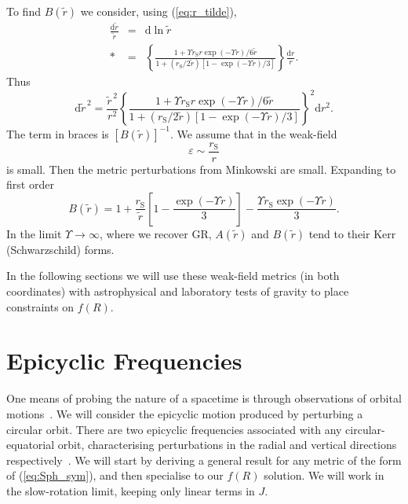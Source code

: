 \documentclass[aps,prd,amsfonts,amssymb,amsmath,nofootinbib,reprint,showpacs]{revtex4-1}
\newcommand{\eqnref}[1]{(\ref{eq:#1})}
\newcommand{\sub}[1]{\ensuremath{_\text{#1}}}
\newcommand{\dd}{\ensuremath{\text{d}}}
\begin{document}
To find $B(\widetilde{r})$ we consider, using \eqnref{r_tilde},
\begin{eqnarray}
\frac{\dd \widetilde{r}}{\widetilde{r}} & = & \dd \ln \widetilde{r} \nonumber \\*
 & = & \left\{\frac{1 + {\Upsilon r\sub{S}r\exp(-\Upsilon r)}/{6\widetilde{r}}}{1 + ({r\sub{S}}/{2\widetilde{r}})\left[1 - {\exp(-\Upsilon r)}/{3}\right]}\right\}\frac{\dd r}{r}.
\end{eqnarray}
Thus
\begin{equation}
\dd \widetilde{r}^{\,2} = \frac{\widetilde{r}^{\,2}}{r^2}\left\{\frac{1 + {\Upsilon r\sub{S}r\exp(-\Upsilon r)}/{6\widetilde{r}}}{1 + ({r\sub{S}}/{2\widetilde{r}})\left[1 - {\exp(-\Upsilon r)}/{3}\right]}\right\}^2 \dd r^2.
\end{equation}
The term in braces is $\left[B(\widetilde{r})\right]^{-1}$. We assume that in the weak-field
\begin{equation}
\varepsilon \sim \frac{r\sub{S}}{r}
\end{equation}
is small. Then the metric perturbations from Minkowski are small. Expanding to first order~\cite{Olmo2007c}
\begin{equation}
B(\widetilde{r})  = 1 + \frac{r\sub{S}}{\widetilde{r}}\left[1 - \frac{\exp(-\Upsilon r )}{3}\right] - \frac{\Upsilon r\sub{S} \exp(-\Upsilon r)}{3}.
\label{eq:B_metric}
\end{equation}
In the limit $\Upsilon \rightarrow \infty$, where we recover GR, $A(\widetilde{r})$ and $B(\widetilde{r})$ tend to their Kerr (Schwarzschild) forms.

In the following sections we will use these weak-field metrics (in both coordinates) with astrophysical and laboratory tests of gravity to place constraints on $f(R)$.

\section{Epicyclic Frequencies\label{sec:Epicycle}}

One means of probing the nature of a spacetime is through observations of orbital motions~\cite{Gair2008a}. We will consider the epicyclic motion produced by perturbing a circular orbit. There are two epicyclic frequencies associated with any circular-equatorial orbit, characterising perturbations in the radial and vertical directions respectively~\cite{Binney1987}. We will start by deriving a general result for any metric of the form of \eqnref{Sph_sym}, and then specialise to our $f(R)$ solution. We will work in the slow-rotation limit, keeping only linear terms in $J$.
\end{document}
